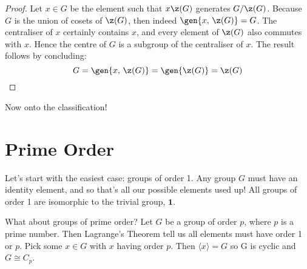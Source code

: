 \begin{proof}
    Let \(x \in G\) be the element such that \(x\z(G)\) generates \(G/\z(G)\).
    Because \(G\) is the union of cosets of \(\z(G)\), then indeed \(\gen{x,\,\z(G)} = G\).
    The centraliser of \(x\) certainly contains \(x\), and every element of \(\z(G)\) also commutes with \(x\).
    Hence the centre of \(G\) is a subgroup of the centraliser of \(x\).
    The result follows by concluding:
    \[G = \gen{x,\,\z(G)} = \gen{\z(G)} = \z(G)\]
\end{proof}

Now onto the classification!

\section{Prime Order}
Let's start with the easiest case: groups of order 1.
Any group \(G\) must have an identity element, and so that's all our possible elements used up!
All groups of order 1 are isomorphic to the trivial group, \(\bm{1}\).

What about groups of prime order?
Let \(G\) be a group of order \(p\), where \(p\) is a prime number.
Then Lagrange's Theorem tell us all elements must have order 1 or \(p\).
Pick some \(x \in G\) with \(x\) having order \(p\).
Then \(\langle x \rangle = G\) so G is cyclic and \(G \cong C_p\).
